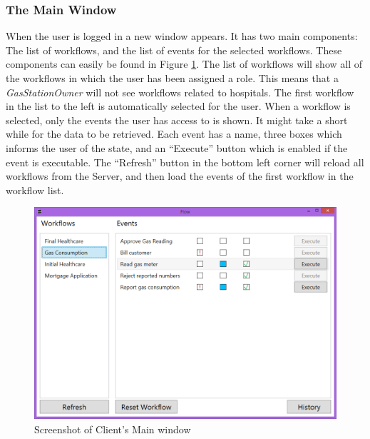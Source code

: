 \subsubsection{The Main Window}
When the user is logged in a new window appears. It has two main components: The list of workflows, and the list of events for the selected workflows. These components can easily be found in Figure \ref{fig:MainWindowClient}. The list of workflows will show all of the workflows in which the user has been assigned a role. This means that a \textit{GasStationOwner} will not see workflows related to hospitals. The first workflow in the list to the left is automatically selected for the user. \newline
When a workflow is selected, only the events the user has access to is shown. It might take a short while for the data to be retrieved. Each event has a name, three boxes which informs the user of the state, and an “Execute” button which is enabled if the event is executable. \newline
The “Refresh” button in the bottom left corner will reload all workflows from the Server, and then load the events of the first workflow in the workflow list.

\begin{figure}
\centering
\includegraphics[width=\linewidth]{Figures/FlowMainWindow}
\caption{\label{fig:MainWindowClient} Screenshot of Client's Main window}
\end{figure}

